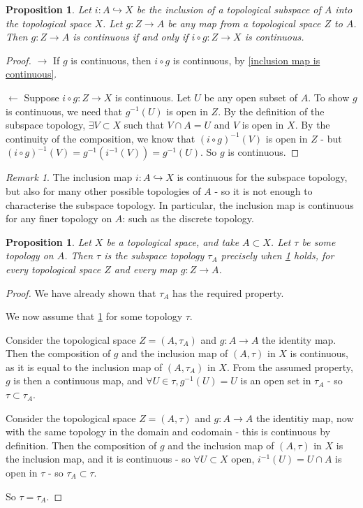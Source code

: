 \documentclass{article}
\theoremstyle{definition}
\theoremstyle{plain}%
\newtheorem{prop}[thm]{Proposition}
\theoremstyle{remark}
\newtheorem*{rem}{Remark}
\newcommand{\intersection}{\cap}
\newcommand{\injection}{\hookrightarrow}
\begin{document}
\begin{prop}\label{inclusion continuous iff composition continuous}
    Let $i : A \injection X$ be the inclusion of a topological subspace of $A$ into the topological space $X$. Let $g : Z \to A$ be any map from a topological space $Z$ to $A$. Then $g : Z \to A$ is continuous if and only if $i \circ g : Z \to X$ is continuous.
\end{prop}

\begin{proof} $ \rightarrow $ If $g$ is continuous, then $i \circ g$ is continuous, by \ref{inclusion map is continuous}.

    $ \leftarrow $ Suppose $i \circ g : Z \to X$ is continuous. Let $U$ be any open subset of $A$. To show $g$ is continuous, we need that $g^{-1}(U)$ is open in $Z$. By the definition of the subspace topology, $\exists V \subset X$ such that $V \intersection A = U$ and $V$ is open in $X$. By the continuity of the composition, we know that $(i \circ g)^{-1}(V)$ is open in $Z$ - but $(i \circ g)^{-1}(V) = g^{-1}(i^{-1}(V)) = g^{-1}(U)$. So $g$ is continuous.
\end{proof}

\begin{rem}
    The inclusion map $i : A \injection X$ is continuous for the subspace topology, but also for many other possible topologies of $A$ - so it is not enough to characterise the subspace topology. In particular, the inclusion map is continuous for any finer topology on $A$: such as the discrete topology.
\end{rem}

\begin{prop}
    Let $X$ be a topological space, and take $A \subset X$. Let $\tau$ be some topology on $A$. Then $\tau$ is the subspace topology $\tau_A$ precisely when \ref{inclusion continuous iff composition continuous} holds, for every topological space $Z$ and every map $g: Z \to A$.
\end{prop}

\begin{proof}
    We have already shown that $\tau_A$ has the required property.

    We now assume that \ref{inclusion continuous iff composition continuous} for some topology $\tau$.

    Consider the topological space $Z = (A, \tau_A)$ and $g : A \to A$ the identity map. Then the composition of $g$ and the inclusion map of $(A, \tau)$ in $X$ is continuous, as it is equal to the inclusion map of $(A, \tau_A)$ in $X$. From the assumed property, $g$ is then a continuous map, and $\forall U \in \tau, g^{-1}(U) = U$ is an open set in $\tau_A$ - so $\tau \subset \tau_A$.

    Consider the topological space $Z = (A, \tau)$ and $g : A \to A$ the identitiy map, now with the same topology in the domain and codomain - this is continuous by definition. Then the composition of $g$ and the inclusion map of $(A, \tau)$ in $X$ is the inclusion map, and it is continuous - so $\forall U \subset X$ open, $i^{-1}(U) = U \intersection A$ is open in $\tau$ - so $\tau_A \subset \tau$.

    So $\tau = \tau_A$.
\end{proof}
\end{document}

